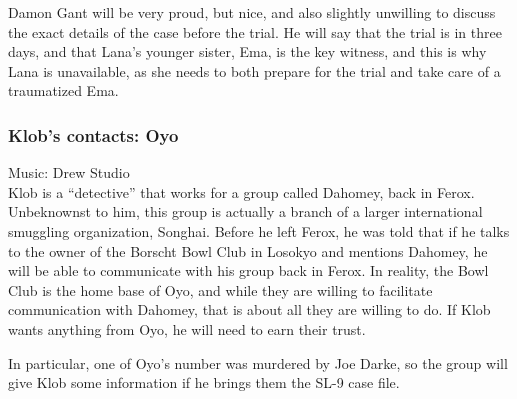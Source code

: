 Damon Gant will be very proud, but nice, and also slightly unwilling to discuss the exact details of the case before the trial. He will say that the trial is in three days, and that Lana's younger sister, Ema, is the key witness, and this is why Lana is unavailable, as she needs to both prepare for the trial and take care of a traumatized Ema. 

\subsubsection{Klob's contacts: Oyo}
Music: Drew Studio\\
Klob is a ``detective'' that works for a group called Dahomey, back in Ferox. Unbeknownst to him, this group is actually a branch of a larger international smuggling organization, Songhai. Before he left Ferox, he was told that if he talks to the owner of the Borscht Bowl Club in Losokyo and mentions Dahomey, he will be able to communicate with his group back in Ferox. In reality, the Bowl Club is the home base of Oyo, and while they are willing to facilitate communication with Dahomey, that is about all they are willing to do. If Klob wants anything from Oyo, he will need to earn their trust.

In particular, one of Oyo's number was murdered by Joe Darke, so the group will give Klob some information if he brings them the SL-9 case file. 

